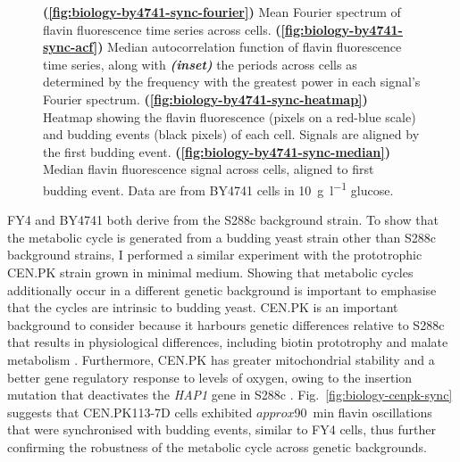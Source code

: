 \begin{figure}
  \caption[
    Mean Fourier spectrum of flavin fluorescence time series across cells.
    Median autocorrelation function of flavin fluorescence time series, along with the periods across cells.
    Heatmap showing the flavin fluorescence and budding events of each cell.
    Median flavin fluorescence signal across cells, aligned to first budding event.
    Data are from BY4741 cells in \SI{10}{\gram~\litre^{-1}} glucose.
  ]{
    \textbf{(\ref{fig:biology-by4741-sync-fourier})} Mean Fourier spectrum of flavin fluorescence time series across cells.
    \textbf{(\ref{fig:biology-by4741-sync-acf})} Median autocorrelation function of flavin fluorescence time series, along with \textit{\textbf{(inset)}} the periods across cells as determined by the frequency with the greatest power in each signal's Fourier spectrum.
    \textbf{(\ref{fig:biology-by4741-sync-heatmap})}
    Heatmap showing the flavin fluorescence (pixels on a red-blue scale) and budding events (black pixels) of each cell.
    Signals are aligned by the first budding event.
    \textbf{(\ref{fig:biology-by4741-sync-median})}
    Median flavin fluorescence signal across cells, aligned to first budding event.
    Data are from BY4741 cells in \SI{10}{\gram~\litre^{-1}} glucose.
  }
  \label{fig:biology-by4741-sync}
\end{figure}

FY4 and BY4741 both derive from the S288c background strain.
To show that the metabolic cycle is generated from a budding yeast strain other than S288c background strains, I performed a similar experiment with the prototrophic CEN.PK strain grown in minimal medium.
Showing that metabolic cycles additionally occur in a different genetic background is important to emphasise that the cycles are intrinsic to budding yeast.
CEN.PK is an important background to consider because it harbours genetic differences relative to S288c that results in physiological differences, including biotin prototrophy and malate metabolism \parencite{nijkampNovoSequencingAssembly2012}.
Furthermore, CEN.PK has greater mitochondrial stability and a better gene regulatory response to levels of oxygen, owing to the insertion mutation that deactivates the \textit{HAP1} gene in S288c \parencite{gaisneNaturalMutationSaccharomyces1999}.
Fig.\ \ref{fig:biology-cenpk-sync} suggests that CEN.PK113-7D cells exhibited $approx$\SI{90}{\minute} flavin oscillations that were synchronised with budding events, similar to FY4 cells, thus further confirming the robustness of the metabolic cycle across genetic backgrounds.

